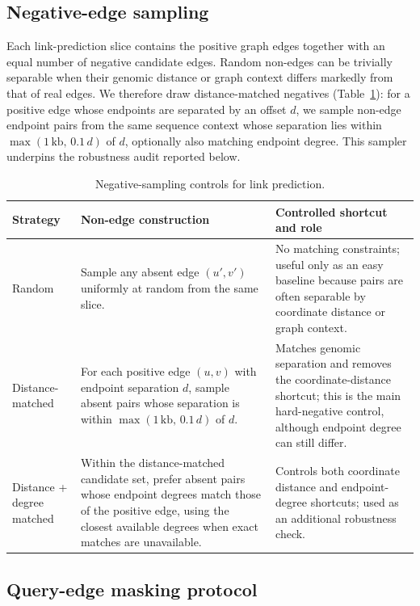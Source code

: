 \IfFileExists{ws-procs11x85.cls}{\worldscientificclasstrue\documentclass{ws-procs11x85}}{\worldscientificclassfalse\documentclass[11pt]{article}\usepackage[margin=1in]{geometry}}
\providecommand{\tbl}[2]{\caption{#1}#2}
\providecommand{\toprule}{\hline}
\providecommand{\colrule}{\hline}
\providecommand{\botrule}{\hline}
\begin{document}
\subsection{Negative-edge sampling}

Each link-prediction slice contains the positive graph edges together with an
equal number of negative candidate edges. Random non-edges can be trivially
separable when their genomic distance or graph context differs markedly from
that of real edges. We therefore draw distance-matched negatives
(Table~\ref{tab:neg_sampling}): for a positive edge whose endpoints are separated
by an offset $d$, we sample non-edge endpoint pairs from the same sequence
context whose separation lies within $\max(1\,\mathrm{kb},\,0.1\,d)$ of $d$,
optionally also matching endpoint degree. This sampler underpins the robustness
audit reported below.

\begin{table}[t]
\tbl{Negative-sampling controls for link prediction.}
{\small
\begin{tabular}{@{}>{\raggedright\arraybackslash}p{0.25\textwidth}>{\raggedright\arraybackslash}p{0.31\textwidth}>{\raggedright\arraybackslash}p{0.36\textwidth}@{}}
\toprule
Strategy & Non-edge construction & Controlled shortcut and role\\
\colrule
Random &
Sample any absent edge $(u',v')$ uniformly at random from the same slice. &
No matching constraints; useful only as an easy baseline because pairs are often
separable by coordinate distance or graph context.\\
Distance-matched &
For each positive edge $(u,v)$ with endpoint separation $d$, sample absent
pairs whose separation is within $\max(1\,\mathrm{kb},\,0.1\,d)$ of $d$. &
Matches genomic separation and removes the coordinate-distance shortcut; this is
the main hard-negative control, although endpoint degree can still differ.\\
Distance + degree matched &
Within the distance-matched candidate set, prefer absent pairs whose endpoint
degrees match those of the positive edge, using the closest available degrees
when exact matches are unavailable. &
Controls both coordinate distance and endpoint-degree shortcuts; used as an
additional robustness check.\\
\botrule
\end{tabular}}
\label{tab:neg_sampling}
\end{table}

\subsection{Query-edge masking protocol}
\end{document}
